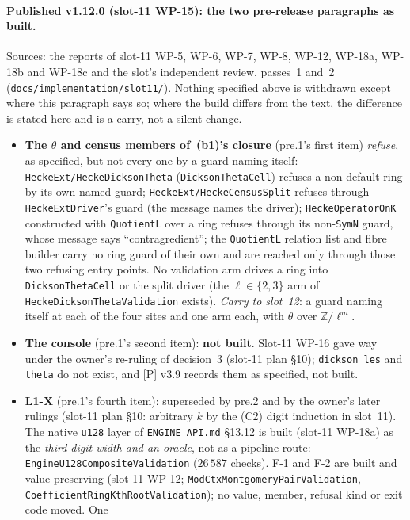 \documentclass[11pt]{article}
\theoremstyle{remark}
\newcommand{\Z}{\mathbb{Z}}
\begin{document}
\paragraph{Published v1.12.0 (slot-11 WP-15): the two pre-release paragraphs as built.} Sources: the
reports of slot-11 WP-5, WP-6, WP-7, WP-8, WP-12, WP-18a, WP-18b and WP-18c and the slot's independent
review, passes~1 and~2 (\texttt{docs/implementation/slot11/}). Nothing specified above is withdrawn
except where this paragraph says so; where the build differs from the text, the difference is stated
here and is a carry, not a silent change.
\begin{itemize}
\item \textbf{The $\theta$ and census members of~(b1)'s closure} (pre.1's first item) \emph{refuse}, as
  specified, but not every one by a guard naming itself: \texttt{HeckeExt/HeckeDicksonTheta}
  (\texttt{DicksonThetaCell}) refuses a non-default ring by its own named guard; \texttt{HeckeExt/HeckeCensusSplit}
  refuses through \texttt{HeckeExtDriver}'s guard (the message names the driver);
  \texttt{HeckeOperatorOnK} constructed with \texttt{QuotientL} over a ring refuses through its
  non-\texttt{SymN} guard, whose message says ``contragredient''; the \texttt{QuotientL} relation list and
  fibre builder carry no ring guard of their own and are reached only through those two refusing entry
  points. No validation arm drives a ring into \texttt{DicksonThetaCell} or the split driver (the
  $\ell\in\{2,3\}$ arm of \texttt{HeckeDicksonThetaValidation} exists). \emph{Carry to slot~12}: a guard
  naming itself at each of the four sites and one arm each, with $\theta$ over $\Z/\ell^m$.
\item \textbf{The console} (pre.1's second item): \textbf{not built}. Slot-11 WP-16 gave way under the
  owner's re-ruling of decision~3 (slot-11 plan \S10); \texttt{dickson\_les} and \texttt{theta} do not
  exist, and [P] v3.9 records them as specified, not built.
\item \textbf{L1-X} (pre.1's fourth item): superseded by pre.2 and by the owner's later rulings (slot-11
  plan \S10: arbitrary $k$ by the (C2) digit induction in slot~11). The native \texttt{u128} layer of
  \texttt{ENGINE\_API.md} \S13.12 is built (slot-11 WP-18a) as the \emph{third digit width and an
  oracle}, not as a pipeline route: \texttt{EngineU128CompositeValidation} ($26\,587$ checks). F-1 and F-2
  are built and value-preserving (slot-11 WP-12; \texttt{ModCtxMontgomeryPairValidation},
  \texttt{CoefficientRingKthRootValidation}); no value, member, refusal kind or exit code moved. One

\end{itemize}
\end{document}
